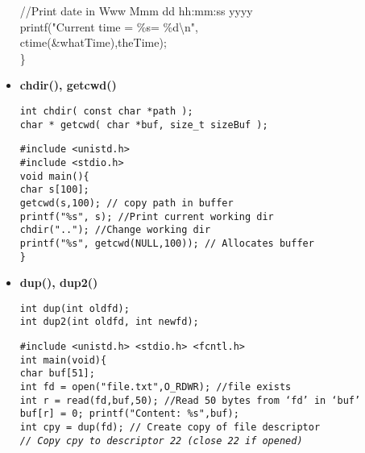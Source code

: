 \begin{flushleft}
\begin{flushleft}
\begin{itemize}
{                    \halftab //Print date in Www Mmm dd hh:mm:ss yyyy \\
                    \halftab printf("Current time = \%s= \%d\textbackslash n", \\ \tab \tab ctime(\&whatTime),theTime); \\
                    \}} 
      \item \textbf{chdir(), getcwd()} \par 
            \texttt{int chdir( const char *path );\\
                    char * getcwd( char *buf, size\_t sizeBuf );}\par 
            \texttt{\#include <unistd.h> \\
                    \#include <stdio.h>\\
                    void main()\{ \\
                    \halftab char s[100]; \\
                    \halftab getcwd(s,100); // copy path in buffer \\
                    \halftab printf("\%s\n", s); //Print current working dir \\
                    \halftab chdir(".."); //Change working dir \\
                    \halftab printf("\%s\n", getcwd(NULL,100)); // Allocates buffer\\
                    \}}
      \item \textbf{dup(), dup2()}\par 
            \texttt{int dup(int oldfd);\\
                    int dup2(int oldfd, int newfd);}  \par
            \texttt{\#include <unistd.h> <stdio.h> <fcntl.h>\\
                    int main(void)\{\\
                    \halftab char buf[51];\\
                    \halftab int fd = open("file.txt",O\_RDWR); //file exists\\
                    \halftab int r = read(fd,buf,50); //Read 50 bytes from ‘fd’ in ‘buf’\\
                    \halftab buf[r] = 0; printf("Content: \%s\n",buf);\\
                    \halftab int cpy = dup(fd); // Create copy of file descriptor\\
                    \halftab \textit{// Copy cpy to descriptor 22 (close 22 if opened)} \\
}
\end{itemize}
\end{flushleft}
\end{flushleft}
